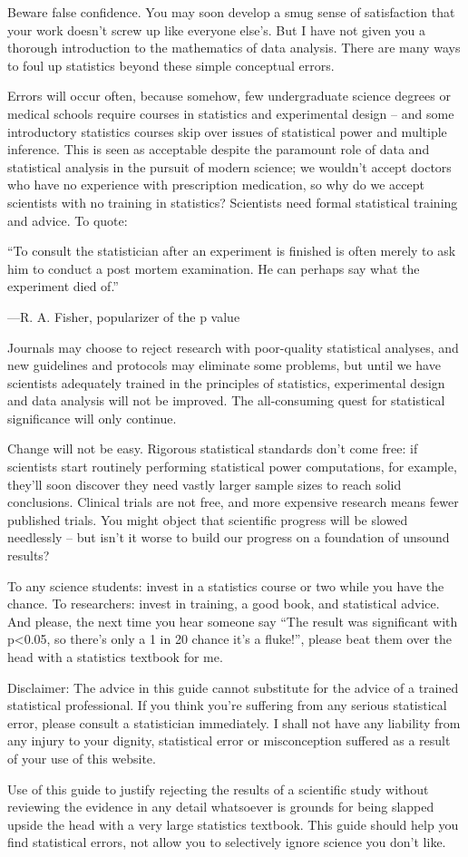 Beware false confidence. You may soon develop a smug sense of satisfaction that your work doesn’t screw up like everyone else’s. But I have not given you a thorough introduction to the mathematics of data analysis. There are many ways to foul up statistics beyond these simple conceptual errors.

Errors will occur often, because somehow, few undergraduate science degrees or medical schools require courses in statistics and experimental design – and some introductory statistics courses skip over issues of statistical power and multiple inference. This is seen as acceptable despite the paramount role of data and statistical analysis in the pursuit of modern science; we wouldn’t accept doctors who have no experience with prescription medication, so why do we accept scientists with no training in statistics? Scientists need formal statistical training and advice. To quote:

    “To consult the statistician after an experiment is finished is often merely to ask him to conduct a post mortem examination. He can perhaps say what the experiment died of.”

    —R. A. Fisher, popularizer of the p value

Journals may choose to reject research with poor-quality statistical analyses, and new guidelines and protocols may eliminate some problems, but until we have scientists adequately trained in the principles of statistics, experimental design and data analysis will not be improved. The all-consuming quest for statistical significance will only continue.

Change will not be easy. Rigorous statistical standards don’t come free: if scientists start routinely performing statistical power computations, for example, they’ll soon discover they need vastly larger sample sizes to reach solid conclusions. Clinical trials are not free, and more expensive research means fewer published trials. You might object that scientific progress will be slowed needlessly – but isn’t it worse to build our progress on a foundation of unsound results?

To any science students: invest in a statistics course or two while you have the chance. To researchers: invest in training, a good book, and statistical advice. And please, the next time you hear someone say “The result was significant with p<0.05, so there’s only a 1 in 20 chance it’s a fluke!”, please beat them over the head with a statistics textbook for me.

Disclaimer: The advice in this guide cannot substitute for the advice of a trained statistical professional. If you think you’re suffering from any serious statistical error, please consult a statistician immediately. I shall not have any liability from any injury to your dignity, statistical error or misconception suffered as a result of your use of this website.

Use of this guide to justify rejecting the results of a scientific study without reviewing the evidence in any detail whatsoever is grounds for being slapped upside the head with a very large statistics textbook. This guide should help you find statistical errors, not allow you to selectively ignore science you don’t like.